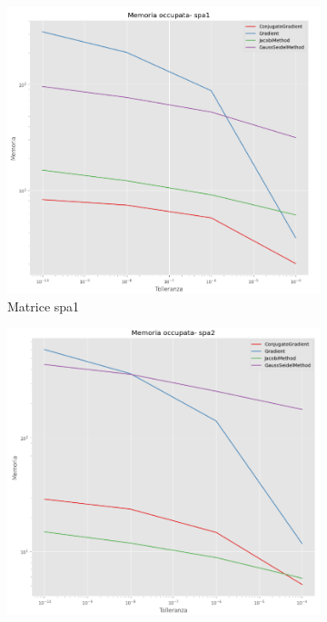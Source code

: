 \begin{figure}[!ht]
    \centering
    \begin{subfigure}{0.45\textwidth}
        \centering
        \includegraphics[width=\textwidth]{./../report/Progetto_1_bis/img/mem_spa1.png}
        \caption{Matrice spa1}
        \label{fig:mem_spa1}
    \end{subfigure}
    \begin{subfigure}{0.45\textwidth}
        \centering
        \includegraphics[width=\textwidth]{./../report/Progetto_1_bis/img/mem_spa2.png}

\end{subfigure}
\end{figure}
